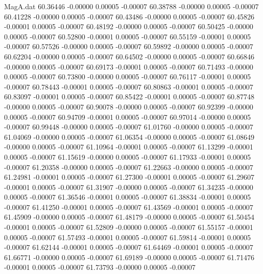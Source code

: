 \begin{filecontents}{MagA.dat}
  60.36446   -0.00000    0.00005   -0.00007
  60.38788   -0.00000    0.00005   -0.00007
  60.41228   -0.00000    0.00005   -0.00007
  60.43486   -0.00000    0.00005   -0.00007
  60.45826   -0.00001    0.00005   -0.00007
  60.48192   -0.00000    0.00005   -0.00007
  60.50425   -0.00000    0.00005   -0.00007
  60.52800   -0.00001    0.00005   -0.00007
  60.55159   -0.00001    0.00005   -0.00007
  60.57526   -0.00000    0.00005   -0.00007
  60.59892   -0.00000    0.00005   -0.00007
  60.62204   -0.00000    0.00005   -0.00007
  60.64502   -0.00000    0.00005   -0.00007
  60.66846   -0.00000    0.00005   -0.00007
  60.69173   -0.00001    0.00005   -0.00007
  60.71493   -0.00000    0.00005   -0.00007
  60.73800   -0.00000    0.00005   -0.00007
  60.76117   -0.00001    0.00005   -0.00007
  60.78443   -0.00001    0.00005   -0.00007
  60.80863   -0.00001    0.00005   -0.00007
  60.83097   -0.00001    0.00005   -0.00007
  60.85422   -0.00001    0.00005   -0.00007
  60.87748   -0.00000    0.00005   -0.00007
  60.90078   -0.00000    0.00005   -0.00007
  60.92399   -0.00000    0.00005   -0.00007
  60.94709   -0.00001    0.00005   -0.00007
  60.97014   -0.00000    0.00005   -0.00007
  60.99448   -0.00000    0.00005   -0.00007
  61.01760   -0.00000    0.00005   -0.00007
  61.04069   -0.00000    0.00005   -0.00007
  61.06354   -0.00000    0.00005   -0.00007
  61.08649   -0.00000    0.00005   -0.00007
  61.10964   -0.00001    0.00005   -0.00007
  61.13299   -0.00001    0.00005   -0.00007
  61.15619   -0.00000    0.00005   -0.00007
  61.17933   -0.00001    0.00005   -0.00007
  61.20358   -0.00000    0.00005   -0.00007
  61.22663   -0.00000    0.00005   -0.00007
  61.24981   -0.00001    0.00005   -0.00007
  61.27300   -0.00001    0.00005   -0.00007
  61.29607   -0.00001    0.00005   -0.00007
  61.31907   -0.00000    0.00005   -0.00007
  61.34235   -0.00000    0.00005   -0.00007
  61.36546   -0.00001    0.00005   -0.00007
  61.38834   -0.00001    0.00005   -0.00007
  61.41250   -0.00001    0.00005   -0.00007
  61.43569   -0.00001    0.00005   -0.00007
  61.45909   -0.00000    0.00005   -0.00007
  61.48179   -0.00000    0.00005   -0.00007
  61.50454   -0.00001    0.00005   -0.00007
  61.52809   -0.00000    0.00005   -0.00007
  61.55157   -0.00001    0.00005   -0.00007
  61.57493   -0.00001    0.00005   -0.00007
  61.59814   -0.00001    0.00005   -0.00007
  61.62144   -0.00001    0.00005   -0.00007
  61.64469   -0.00001    0.00005   -0.00007
  61.66771   -0.00000    0.00005   -0.00007
  61.69189   -0.00000    0.00005   -0.00007
  61.71476   -0.00001    0.00005   -0.00007
  61.73793   -0.00000    0.00005   -0.00007

\end{filecontents}
